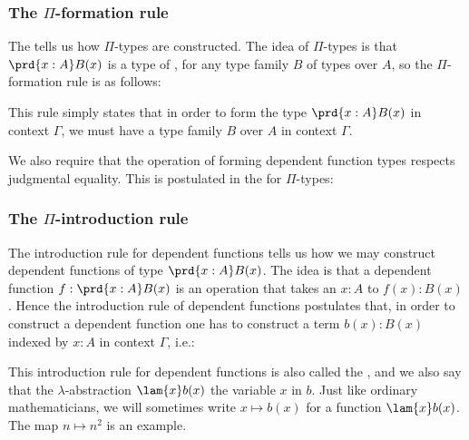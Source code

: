 \subsubsection{The $\Pi$-formation rule}
The  tells us how $\Pi$-types are constructed. The idea of $\Pi$-types is that $\prd{x:A}B(x)$ is a type of , for any type family $B$ of types over $A$, so the $\Pi$-formation rule is as follows:
\begin{prooftree}
\end{prooftree}
This rule simply states that in order to form the type $\prd{x:A}B(x)$ in context $\Gamma$, we must have a type family $B$ over $A$ in context $\Gamma$.

We also require that the operation of forming dependent function types respects judgmental equality. This is postulated in the  for $\Pi$-types:
\begin{prooftree}
\end{prooftree}

\subsubsection{The $\Pi$-introduction rule}
The introduction rule for dependent functions tells us how we may construct dependent functions of type $\prd{x:A}B(x)$. The idea is that a dependent function $f:\prd{x:A}B(x)$ is an operation that takes an $x:A$ to $f(x):B(x)$. Hence the introduction rule of dependent functions postulates that, in order to construct a dependent function one has to construct a term $b(x):B(x)$ indexed by $x:A$ in context $\Gamma$, i.e.:
\begin{prooftree}
\end{prooftree}
This introduction rule%
for dependent functions is also called the %
%
%
, and we also say that the $\lambda$-abstraction $\lam{x}b(x)$  the variable $x$ in $b$. Just like ordinary mathematicians, we will sometimes write $x\mapsto b(x)$ for a function $\lam{x}b(x)$. The map $n\mapsto n^2$ is an example.


